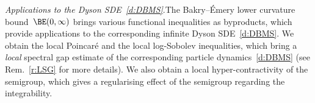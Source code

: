 \documentclass[11pt,letterpaper]{amsart}
\newcommand{\dUpsilon}{{\mathbf \Upsilon}}
\newcommand{\U}{\dUpsilon}
\renewcommand{\1}{\mathbf 1}
\numberwithin{equation}{section}
\theoremstyle{plain}
\theoremstyle{definition}
\theoremstyle{remark}
\renewcommand{\paragraph}[1]{\medskip\emph{#1}.\quad}
\begin{document}
\paragraph{Applications to the Dyson SDE~\eqref{d:DBMS}}The Bakry--\'Emery lower curvature bound~$\BE(0,\infty)$ brings various functional inequalities as byproducts, which provide applications to the corresponding infinite Dyson SDE~\eqref{d:DBMS}.  We obtain the local Poincar\'e and the local log-Sobolev inequalities, which bring a {\it local} spectral gap estimate of the corresponding particle dynamics~\eqref{d:DBMS} (see Rem.~\ref{r:LSG} for more details). We also obtain a local hyper-contractivity of the semigroup, which gives a regularising effect of the semigroup regarding the integrability. 
\end{document}
